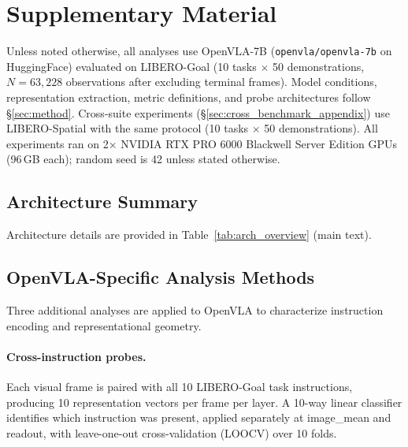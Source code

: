 \clearpage
\appendix

\section{Supplementary Material}
\label{sec:appendix}

Unless noted otherwise, all analyses use OpenVLA-7B (\texttt{openvla/openvla-7b} on HuggingFace) evaluated on LIBERO-Goal (10 tasks $\times$ 50 demonstrations, $N = 63{,}228$ observations after excluding terminal frames).
Model conditions, representation extraction, metric definitions, and probe architectures follow \S\ref{sec:method}.
Cross-suite experiments (\S\ref{sec:cross_benchmark_appendix}) use LIBERO-Spatial with the same protocol (10 tasks $\times$ 50 demonstrations).
All experiments ran on 2$\times$ NVIDIA RTX PRO 6000 Blackwell Server Edition GPUs (96\,GB each); random seed is 42 unless stated otherwise.

\subsection{Architecture Summary}
Architecture details are provided in Table~\ref{tab:arch_overview} (main text).

\subsection{OpenVLA-Specific Analysis Methods}
\label{sec:openvla_methods_appendix}

Three additional analyses are applied to OpenVLA to characterize instruction encoding and representational geometry.

\paragraph{Cross-instruction probes.}
Each visual frame is paired with all 10 LIBERO-Goal task instructions, producing 10 representation vectors per frame per layer.
A 10-way linear classifier identifies which instruction was present, applied separately at image\_mean and readout, with leave-one-out cross-validation (LOOCV) over 10 folds.

